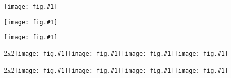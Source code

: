 \documentclass{article}
\def\f1#1{\texttt{[image: fig.\#1]}}
\def\fig4#1#2#3#4{\table2x2{\f1{#1}}{\f1{#2}}{\f1{#3}}{\f1{#4}}}
\begin{document}
\f1{10}

\f1 9
\newpage

\f1 0
\newpage

\fig4 1 2 3 4
\newpage

\fig4 5 6 7 8
\end{document}
